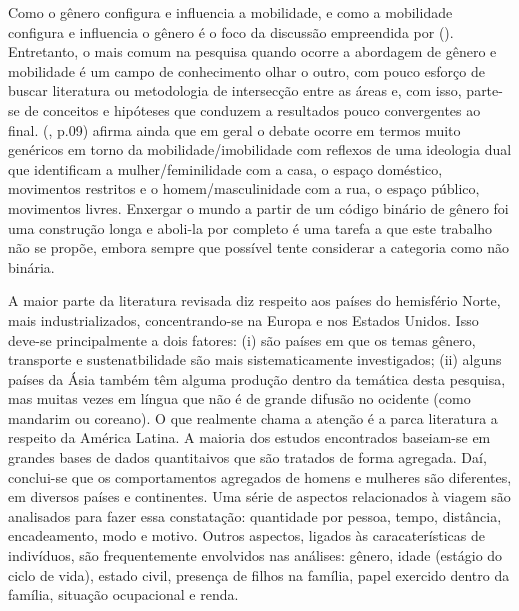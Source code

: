 
Como o gênero configura e influencia a mobilidade, e como a mobilidade configura e influencia o gênero é o foco da discussão empreendida por  (\citeyear{HANSON2010}). Entretanto, o mais comum na pesquisa quando ocorre a abordagem de gênero e mobilidade é um campo de conhecimento olhar o outro, com pouco esforço de buscar literatura ou metodologia de intersecção entre as áreas e, com isso, parte-se de conceitos e hipóteses que conduzem a resultados pouco convergentes ao final.  (\citeyear{HANSON2010}, p.09) afirma ainda que em geral o debate ocorre em termos muito genéricos em torno da mobilidade/imobilidade com reflexos de uma ideologia dual que identificam a mulher/feminilidade com a casa, o espaço doméstico, movimentos restritos e o homem/masculinidade com a rua, o espaço público, movimentos livres. Enxergar o mundo a partir de um código binário de gênero foi uma construção longa e aboli-la por completo é uma tarefa a que este trabalho não se propõe, embora sempre que possível tente considerar a categoria como não binária.

A maior parte da literatura revisada diz respeito aos países do hemisfério Norte, mais industrializados, concentrando-se na Europa e nos Estados Unidos. Isso deve-se principalmente a dois fatores: (i) são países em que os temas gênero, transporte e sustenatbilidade são mais sistematicamente investigados; (ii) alguns países da Ásia também têm alguma produção dentro da temática desta pesquisa, mas muitas vezes em língua que não é de grande difusão no ocidente (como mandarim ou coreano). O que realmente chama a atenção é a parca literatura a respeito da América Latina. A maioria dos estudos encontrados baseiam-se em grandes bases de dados quantitaivos que são tratados de forma agregada. Daí, conclui-se que os comportamentos agregados de homens e  mulheres são diferentes, em diversos países e continentes. Uma série de aspectos relacionados à viagem são analisados para fazer essa constatação: quantidade por pessoa, tempo, distância, encadeamento, modo e motivo. Outros aspectos, ligados às caracaterísticas de indivíduos, são frequentemente envolvidos nas análises: gênero, idade (estágio do ciclo de vida), estado civil, presença de filhos na família, papel exercido dentro da família, situação ocupacional e renda.



